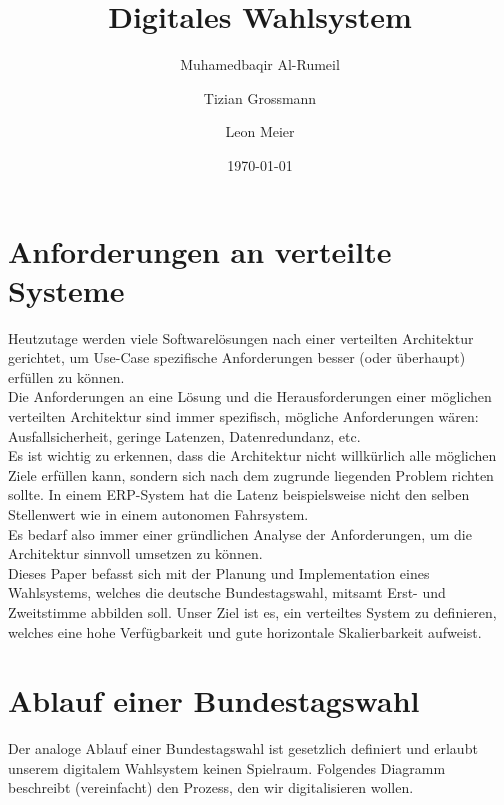 \documentclass{article}  %
\title{Digitales Wahlsystem}
\author{
    Muhamedbaqir Al-Rumeil \and 
    Tizian Grossmann \and 
    Leon Meier
    }
\date{\today}  %
\begin{document}

\maketitle
\newpage

\tableofcontents
\newpage

\section{Anforderungen an verteilte Systeme}

Heutzutage werden viele Softwarelösungen nach einer verteilten Architektur gerichtet, um Use-Case spezifische Anforderungen besser (oder überhaupt) erfüllen zu können. \\
Die Anforderungen an eine Lösung und die Herausforderungen einer möglichen verteilten Architektur sind immer spezifisch, mögliche Anforderungen wären: Ausfallsicherheit, geringe Latenzen, Datenredundanz, etc.  \\

Es ist wichtig zu erkennen, dass die Architektur nicht willkürlich alle möglichen Ziele erfüllen kann, sondern sich nach dem zugrunde liegenden Problem richten sollte. In einem ERP-System hat die Latenz beispielsweise nicht den selben Stellenwert wie in einem autonomen Fahrsystem. \\
Es bedarf also immer einer gründlichen Analyse der Anforderungen, um die Architektur sinnvoll umsetzen zu können. \\


Dieses Paper befasst sich mit der Planung und Implementation eines Wahlsystems, welches die deutsche Bundestagswahl, mitsamt Erst- und Zweitstimme abbilden soll. Unser Ziel ist es, ein verteiltes System zu definieren, welches eine hohe Verfügbarkeit und gute horizontale Skalierbarkeit aufweist.
  
\newpage

\section{Ablauf einer Bundestagswahl}
Der analoge Ablauf einer Bundestagswahl ist gesetzlich definiert und erlaubt unserem digitalem Wahlsystem keinen Spielraum. Folgendes Diagramm beschreibt (vereinfacht) den Prozess, den wir digitalisieren wollen. \\
\end{document}
